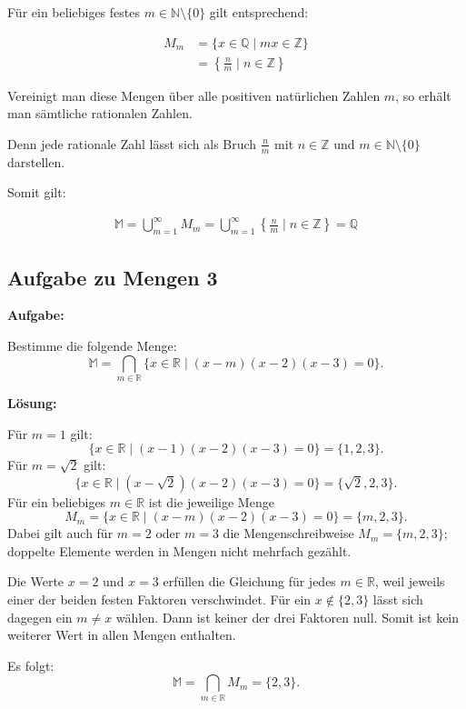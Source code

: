 Für ein beliebiges festes
$m\in\mathbb{N}\setminus\{0\}$ gilt entsprechend:

\begin{align*}
	M_m
	&= \{x\in\mathbb{Q}\mid mx\in\mathbb{Z}\}\\
	&= \left\{\frac{n}{m}\mid n\in\mathbb{Z}\right\}
\end{align*}

Vereinigt man diese Mengen über alle positiven
natürlichen Zahlen $m$, so erhält man sämtliche
rationalen Zahlen.

Denn jede rationale Zahl lässt sich als Bruch
$\frac{n}{m}$ mit $n\in\mathbb{Z}$ und
$m\in\mathbb{N}\setminus\{0\}$ darstellen.

Somit gilt:

\begin{align*}
	\boxed{
		\mathbb{M}
		= \bigcup_{m=1}^{\infty} M_m
		= \bigcup_{m=1}^{\infty}
		\left\{\frac{n}{m}\mid n\in\mathbb{Z}\right\}
		= \mathbb{Q}
	}
\end{align*}



\subsection{Aufgabe zu Mengen 3}

\textbf{Aufgabe:}

Bestimme die folgende Menge:
\[
 \mathbb{M}=\bigcap_{m\in\mathbb{R}}
 \{x\in\mathbb{R}\mid(x-m)(x-2)(x-3)=0\}.
\]

\textbf{Lösung:}

Für $m=1$ gilt:
\[
 \{x\in\mathbb{R}\mid(x-1)(x-2)(x-3)=0\}=\{1,2,3\}.
\]
Für $m=\sqrt{2}$ gilt:
\[
 \{x\in\mathbb{R}\mid(x-\sqrt{2})(x-2)(x-3)=0\}
 =\{\sqrt{2},2,3\}.
\]
Für ein beliebiges $m\in\mathbb{R}$ ist die jeweilige Menge
\[
 M_m=\{x\in\mathbb{R}\mid(x-m)(x-2)(x-3)=0\}
 =\{m,2,3\}.
\]
Dabei gilt auch für $m=2$ oder $m=3$ die Mengenschreibweise
$M_m=\{m,2,3\}$; doppelte Elemente werden in Mengen nicht mehrfach
gezählt.

Die Werte $x=2$ und $x=3$ erfüllen die Gleichung für jedes
$m\in\mathbb{R}$, weil jeweils einer der beiden festen Faktoren
verschwindet. Für ein $x\notin\{2,3\}$ lässt sich dagegen ein
$m\neq x$ wählen. Dann ist keiner der drei Faktoren null.
Somit ist kein weiterer Wert in allen Mengen enthalten.

Es folgt:
\[
 \boxed{\mathbb{M}=\bigcap_{m\in\mathbb{R}}M_m=\{2,3\}.}
\]
